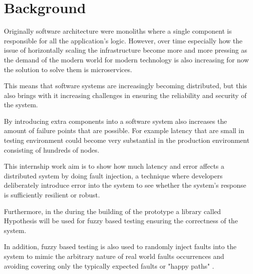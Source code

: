 \chapter{\centering Background}

Originally software architecture were monoliths where a single component is 
responsible for all the application's logic. However, over time especially how 
the issue of horizontally scaling the infrastructure become more and more pressing 
as the demand of the modern world for modern technology is also increasing for now
the solution to solve them is microservices.

This means that software systems are increasingly becoming distributed, but this 
also brings with it increasing challenges in ensuring the reliability and 
security of the system.

By introducing extra components into a software system also increases the amount 
of failure points that are possible. For example latency that are small in 
testing environment could become very substantial in the production environment 
consisting of hundreds of nodes.

This internship work aim is to show how much latency and error affects a distributed
system by doing fault injection, a technique where developers deliberately introduce
error into the system to see whether the system's response is sufficiently resilient 
or robust.

Furthermore, in the during the building of the prototype a library called Hypothesis
will be used for fuzzy based testing ensuring the correctness of the system. 

In addition, fuzzy based testing is also used to randomly inject faults into the system
to mimic the arbitrary nature of real world faults occurrences and avoiding covering
only the typically expected faults or "happy paths" \cite{happy_path}.
